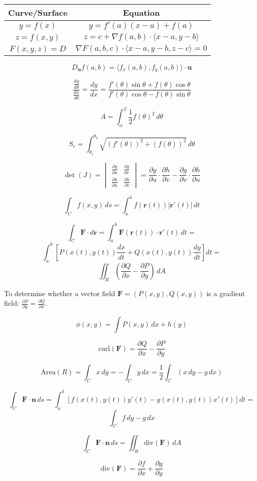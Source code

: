 \documentclass{report}
\begin{document}
\begin{multicols}{2}
	\begin{tabular}{|c|c|}
		\hline
		\textbf{Curve/Surface} & \textbf{Equation}                                                     \\
		\hline
		\( y = f(x) \)         & \( y = f'(a)(x - a) + f(a) \)                                         \\
		\( z = f(x, y) \)      & \( z = c + \nabla f(a, b) \cdot \langle x - a, y - b \rangle \)       \\
		\( F(x, y, z) = D \)   & \( \nabla F(a, b, c) \cdot \langle x - a, y - b, z - c \rangle = 0 \) \\
		\hline
	\end{tabular}

	\[
		D_{\mathbf{u}} f(a, b) = \langle f_x(a, b), f_y(a, b) \rangle \cdot \mathbf{u}
	\]

	\[
		\frac{\frac{dy}{d\theta}}{\frac{dx}{d\theta}} = \frac{dy}{dx} = \frac{f'(\theta) \sin \theta + f(\theta) \cos \theta}{f'(\theta) \cos \theta - f(\theta) \sin \theta}
	\]

	\[
		A = \int_{\alpha}^{\beta} \frac{1}{2} f(\theta)^2 \, d\theta
	\]

	\[
		S_r = \int_{\theta_1}^{\theta_2} \sqrt{\left(f'(\theta)\right)^2 + \left(f(\theta)\right)^2} \, d\theta
	\]

	\[
		\det(J) =
		\begin{vmatrix}
			\frac{\partial g}{\partial u} & \frac{\partial g}{\partial v} \\
			\frac{\partial h}{\partial u} & \frac{\partial h}{\partial v}
		\end{vmatrix}
		= \frac{\partial g}{\partial u} \cdot \frac{\partial h}{\partial v} - \frac{\partial g}{\partial v} \cdot \frac{\partial h}{\partial u}
	\]

	\[
		\int_C f(x, y) \, ds = \int_a^b f(\mathbf{r}(t)) |\mathbf{r}'(t)| \, dt
	\]

	\[
		\int_C \mathbf{F} \cdot d\mathbf{r} = \int_a^b \mathbf{F}(\mathbf{r}(t)) \cdot \mathbf{r}'(t) \, dt =
	\]
	\[
		\int_a^b \left[ P(x(t), y(t)) \frac{dx}{dt} + Q(x(t), y(t)) \frac{dy}{dt} \right] dt =
	\]
	\[
		\iint_R \left( \frac{\partial Q}{\partial x} - \frac{\partial P}{\partial y} \right) \, dA
	\]

	To determine whether a vector field \( \mathbf{F} = (P(x, y), Q(x, y)) \) is a gradient field: \( \frac{\partial P}{\partial y} = \frac{\partial Q}{\partial x} \).

	\[
		\phi(x, y) = \int P(x, y) \, dx + h(y)
	\]

	\[
		\text{curl}(\mathbf{F}) = \frac{\partial Q}{\partial x} - \frac{\partial P}{\partial y}
	\]

	\[
		\text{Area}(R) = \int_C x \, dy = -\int_C y \, dx = \frac{1}{2} \int_C (x \, dy - y \, dx)
	\]

	\[
		\int_C \mathbf{F} \cdot \mathbf{n} \, ds = \int_a^b \left[f(x(t), y(t)) y'(t) - g(x(t), y(t)) x'(t)\right] dt =
	\]
	\[
		\int_C f \, dy - g \, dx
	\]

	\[
		\int_C \mathbf{F} \cdot \mathbf{n} \, ds = \iint_R \text{div}(\mathbf{F}) \, dA
	\]

	\[
		\text{div}(\mathbf{F}) = \frac{\partial f}{\partial x} + \frac{\partial g}{\partial y}
	\]
\end{multicols}
\end{document}

